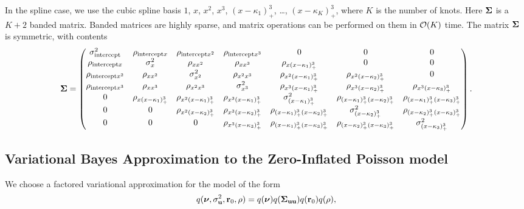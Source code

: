 
In the spline case, we use the cubic spline basis $1$, $x$, $x^2$, $x^3$, $(x -
\kappa_1)^3_+$, \ldots, $(x - \kappa_K)^3_+$, where $K$ is the number of knots.
Here ${\boldsymbol \Sigma}$ is a $K + 2$ banded matrix.  Banded matrices are highly sparse,
and matrix operations can be performed on them in $\mathcal{O}(K)$ time. The matrix
${\boldsymbol \Sigma}$ is symmetric, with contents
\footnotesize{
\[
	{\boldsymbol \Sigma} =
	\begin{pmatrix}
        \sigma^2_{\text{intercept}}&\rho_{\text{intercept} x}&\rho_{\text{intercept} x^2}&\rho_{\text{intercept} x^3}&0&0&0\\
        \rho_{\text{intercept} x}&\sigma^2_x&\rho_{x x^2}&\rho_{x x^3}&\rho_{x (x - \kappa_1)^3_+}&0&0\\
        \rho_{\text{intercept} x^2}&\rho_{x x^2}&\sigma^2_{x^2}&\rho_{x^2 x^3}&\rho_{x^2 (x-\kappa_1)_+^3}&\rho_{x^2 (x-\kappa_2)_+^3}&0\\
        \rho_{\text{intercept} x^3}&\rho_{x x^3}&\rho_{x^2 x^3}&\sigma^2_{x^3}&\rho_{x^3 (x - \kappa_1)_+^3}&\rho_{x^3 (x-\kappa_2)_+^3}&\rho_{x^3 (x - \kappa_3)_+^3}\\
        0&\rho_{x (x - \kappa_1)^3_+}&\rho_{x^2 (x-\kappa_1)_+^3}&\rho_{x^3 (x - \kappa_1)_+^3}&\sigma^2_{(x - \kappa_1)_+^3}&\rho_{(x-\kappa_1)_+^3 (x-\kappa_2)_+^3}&\rho_{(x - \kappa_1)_+^3 (x - \kappa_3)_+^3}\\
        0&0&\rho_{x^2 (x-\kappa_2)_+^3}&\rho_{x^3 (x-\kappa_2)_+^3}&\rho_{(x-\kappa_1)_+^3 (x-\kappa_2)_+^3}&\sigma^2_{(x - \kappa_2)_+^3}&\rho_{(x - \kappa_2)_+^3 (x - \kappa_3)_+^3}\\
        0&0&0&\rho_{x^3 (x - \kappa_3)_+^3}&\rho_{(x - \kappa_1)_+^3 (x - \kappa_3)_+^3}&\rho_{(x - \kappa_2)_+^3 (x - \kappa_3)_+^3}&\sigma^2_{(x - \kappa_3)_+^3}\\
	\end{pmatrix}.
\]
}

\subsection{Variational Bayes Approximation to the Zero-Inflated Poisson model}
We choose a factored variational approximation for the model of the form 
\[
	q({\boldsymbol \nu}, \sigma_{{\bf u}}^2,{\bf r}_0, \rho) = q({\boldsymbol \nu}) q({\boldsymbol \Sigma}_{{\bf u} {\bf u}}) q({\bf r}_0) q(\rho),
\]

